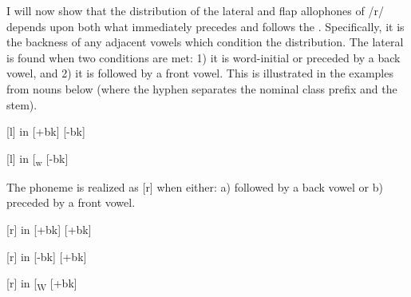 \documentclass[output=paper,modfonts,nonflat,
 hidelinks
]{langsci/langscibook}
\begin{document}
I will now show that the distribution of the lateral and flap allophones of /r/ depends upon both what immediately precedes and follows the . Specifically, it is the backness of any adjacent vowels which condition the distribution. The lateral is found when two conditions %
%
are met: 1) it is word-initial or preceded by a back vowel, and 2) it is followed by a front vowel. This is illustrated in the examples from nouns below (where the hyphen separates the nominal class prefix and the stem).

\ea\label{ex:bickmore:2}
[l] in  [+bk] \underline{ }\underline{ } [-bk]
\ea\label{ex:bickmore:2a}
\ex\label{ex:bickmore:2b}
\ex\label{ex:bickmore:2c}
\ex\label{ex:bickmore:2d}
\z
\z

\ea\label{ex:bickmore:3}
[l] in  [\textsubscript{w} \underline{ }\underline{ } [-bk]
\z

The  phoneme is realized as [r] when either: a) followed by a back vowel or b) preceded by a front vowel.

\ea\label{ex:bickmore:4}
[r] in  [+bk] \underline{ }\underline{ } [+bk]
\ea\label{ex:bickmore:4a}
\ex\label{ex:bickmore:4b}
\ex\label{ex:bickmore:4c}
\ex\label{ex:bickmore:4d}
\z
\z

\ea\label{ex:bickmore:5}
[r] in  [-bk] \underline{ }\underline{ } [+bk]
\ea\label{ex:bickmore:5a}
\ex\label{ex:bickmore:5b}
\ex\label{ex:bickmore:5c}
\ex\label{ex:bickmore:5d}
\z
\z

\noindent\parbox{\textwidth}{\ea\label{ex:bickmore:6}
[r] in  [\textsubscript{W}%
%
 \underline{ }\underline{ } [+bk]
\ea\label{ex:bickmore:6a}
\ex\label{ex:bickmore:6b}
\ex\label{ex:bickmore:6c}
\z
\z}
\end{document}
